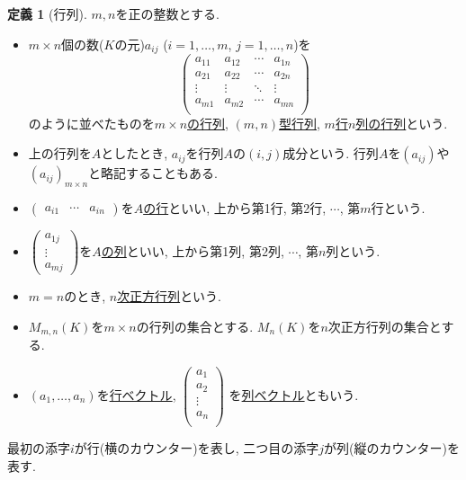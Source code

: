 \documentclass[dvipdfmx,a4paper,11pt]{article} %
\theoremstyle{definition}
\newtheorem{dfn}[thm]{定義}
\begin{document}
   \begin{dfn}[行列]
 $m, n$を正の整数とする.    
\begin{itemize}
	\setlength{\parskip}{0cm}
  	\setlength{\itemsep}{0pt} 
\item $m \times n$個の数($K$の元)$a_{ij}$ ($i = 1, \ldots, m$, $j = 1, \ldots, n$)を
$$
\begin{pmatrix}
a_{11}& a_{12} & \cdots &a_{1n} \\
a_{21}& a_{22} & \cdots &a_{2n} \\
\vdots& \vdots	&	\ddots   &	\vdots \\
a_{m1}& a_{m2} & \cdots &a_{mn} \\
\end{pmatrix}
$$
のように並べたものを\underline{$m \times n$の行列}, \underline{$(m,n)$型行列}, \underline{$m$行$n$列の行列}という. 
\item 上の行列を$A$としたとき, $a_{ij}$を行列$A$の$(i,j)$成分という. 行列$A$を\underline{$(a_{ij})$}や\underline{$(a_{ij})_{m \times n}$}と略記することもある.
\item $\begin{pmatrix} a_{i1} & \cdots & a_{in}\end{pmatrix}$を\underline{$A$の行}といい, 上から第1行, 第2行, $\cdots$, 第$m$行という.
\item $\begin{pmatrix}a_{1j} \\ \vdots  \\ a_{mj}\end{pmatrix}$を\underline{$A$の列}といい, 上から第1列, 第2列, $\cdots$, 第$n$列という.
\item $m=n$のとき, \underline{$n$次正方行列}という.
\item $M_{m, n}(K)$を$m \times n$の行列の集合とする. $M_{n}(K)$を$n$次正方行列の集合とする. 
\item  $(a_1, \ldots, a_n)$を\underline{行ベクトル}, 
 $
 \begin{pmatrix}
a_{1} \\
a_{2}\\
\vdots \\
a_{n}\\
\end{pmatrix}
 $
 を\underline{列ベクトル}ともいう. 
\end{itemize}
    \end{dfn}
 最初の添字$i$が行(横のカウンター)を表し, 二つ目の添字$j$が列(縦のカウンター)を表す. 
 
 
 
\end{document}
